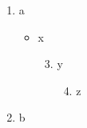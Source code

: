 \documentclass[11pt]{article}
\author{root}
\date{\today}
\title{}
\begin{document}
\tableofcontents

\begin{enumerate}
\item a
\begin{itemize}
\item x
\begin{enumerate}
\setcounter{enumii}{2}
\item y
\begin{enumerate}
\setcounter{enumiii}{3}
\item z
\end{enumerate}
\end{enumerate}
\end{itemize}
\item b
\end{enumerate}
\end{document}
